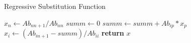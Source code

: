 \documentclass{article}
\begin{document}
  \begin{algorithm}
    \caption{Regressive Substitution Function}
    \begin{algorithmic}[1]
        \State $x_{n} \gets Ab_{nn+1} / Ab_{nn}$
          \State $summ \gets 0$
            \State $summ \gets summ + Ab_{ip} * x_{p}$
          \EndFor
          \State $x_{i} \gets (Ab_{in+1} - summ) / Ab_{ii}$
        \EndFor
        \State \textbf{return} $x$
      \EndProcedure
    \end{algorithmic}
  \end{algorithm}
\end{document}
